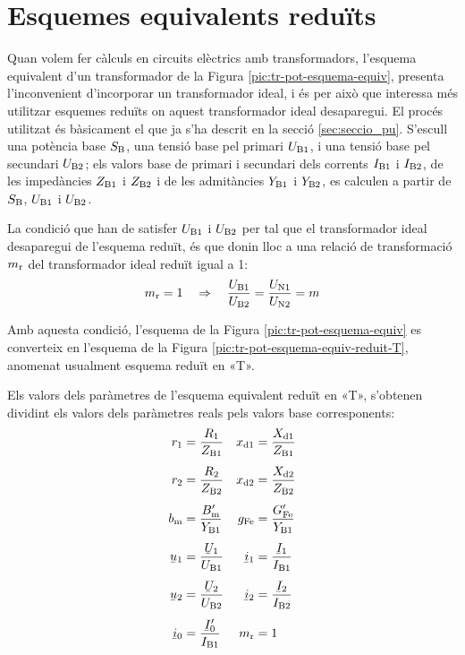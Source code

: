 \section{Esquemes equivalents reduïts}

Quan  volem fer càlculs en circuits elèctrics amb transformadors, l'esquema equivalent d'un transformador de la Figura  \vref{pic:tr-pot-esquema-equiv}, presenta l'inconvenient d'incorporar un transformador ideal, i és per això que interessa més utilitzar esquemes reduïts on aquest transformador ideal desaparegui.
El procés utilitzat és bàsicament el que ja s'ha descrit en la secció \vref{sec:seccio_pu}. S'escull una potència base $S_\mathrm{B}$, una tensió base pel primari $U_\mathrm{B1}$, i una tensió base pel secundari $U_\mathrm{B2}$; els valors base de primari i secundari dels corrents $I_\mathrm{B1}$ i $I_\mathrm{B2}$, de les impedàncies $Z_\mathrm{B1}$ i $Z_\mathrm{B2}$ i de les admitàncies $Y_\mathrm{B1}$ i $Y_\mathrm{B2}$, es calculen a partir de $S_\mathrm{B}$, $U_\mathrm{B1}$ i $U_\mathrm{B2}$.

La condició que han de satisfer $U_\mathrm{B1}$ i $U_\mathrm{B2}$ per tal que el transformador ideal desaparegui de l'esquema reduït, és que donin lloc a una relació de transformació $m_\mathrm{r}$ del transformador ideal reduït igual a  1:
\begin{equation}\label{eq:mr}
    m_\mathrm{r} = 1 \quad \Rightarrow \quad \frac{U_\mathrm{B1}}{U_\mathrm{B2}} = \frac{U_\mathrm{N1}}{U_\mathrm{N2}} = m
\end{equation}

 Amb aquesta condició, l'esquema de la Figura \vref{pic:tr-pot-esquema-equiv} es converteix en l'esquema de la Figura
\vref{pic:tr-pot-esquema-equiv-reduit-T}, anomenat usualment esquema reduït en «T».

\begin{center}
    
    \label{pic:tr-pot-esquema-equiv-reduit-T}
\end{center}

Els valors dels paràmetres de l'esquema equivalent reduït en «T», s'obtenen dividint els valors dels paràmetres reals pels valors base corresponents:
\begin{align}
    r\ped{1} &=\frac{R\ped{1}}{Z\ped{B1}} &   x\ped{d1} &=\frac{X\ped{d1}}{Z\ped{B1}} \\[1ex]
    r\ped{2} &=\frac{R\ped{2}}{Z\ped{B2}} &   x\ped{d2} &=\frac{X\ped{d2}}{Z\ped{B2}} \\[1ex]
    b\ped{m} &=\frac{B\ped{m}'}{Y\ped{B1}}  &   g\ped{Fe} &=\frac{G\ped{Fe}'}{Y\ped{B1}} \\[1ex]
    \cmplx{u}_1 &=\frac{\cmplx{U}_1}{U\ped{B1}} &   \cmplx{i}_1 &=\frac{\cmplx{I}_1}{I\ped{B1}} \\[1ex]
    \cmplx{u}_2 &=\frac{\cmplx{U}_2}{U\ped{B2}} &   \cmplx{i}_2 &=\frac{\cmplx{I}_2}{I\ped{B2}} \\[1ex]
    \cmplx{i}_0 &=\frac{\cmplx{I}_0'}{I\ped{B1}} &   m\ped{r} &=1
\end{align}

